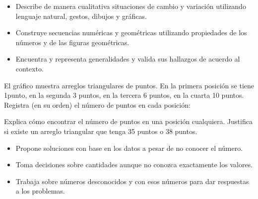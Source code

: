 

\evidencias

\begin{itemize}
  \item Describe de manera cualitativa situaciones de cambio y variación utilizando lenguaje natural, gestos, dibujos y gráficas.
  \item Construye secuencias numéricas y geométricas utilizando propiedades de los números y de las figuras geométricas.
  \item Encuentra y representa generalidades y valida sus hallazgos de acuerdo al contexto.
\end{itemize}

\ejemplo

El gráfico muestra arreglos triangulares de puntos. En la primera posición se tiene 1punto, en la segunda 3 puntos, en la tercera 6 puntos, en la cuarta 10 puntos. Registra (en su orden) el número de puntos en cada posición:



Explica cómo encontrar el número de puntos en una posición cualquiera. Justifica si existe un arreglo triangular que tenga 35 puntos o 38 puntos.


\evidencias

\begin{itemize}
  \item Propone soluciones con base en los datos a pesar de no conocer el número.
  \item Toma decisiones sobre cantidades aunque no conozca exactamente los valores.
  \item Trabaja sobre números desconocidos y con esos números para dar respuestas a los problemas.
\end{itemize}

